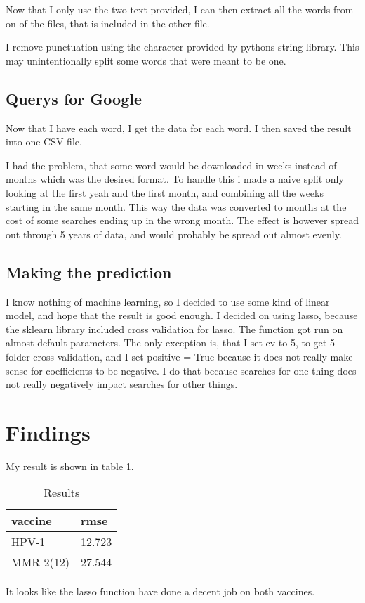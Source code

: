 \documentclass{sig-alternate}
\begin{document}
Now that I only use the two text provided, I can then extract all the words from on of the files, that is included in the other file.

I remove punctuation using the character provided by pythons string library. This may unintentionally split some words that were meant to be one.

\subsection*{Querys for Google}
Now that I have each word, I get the data for each word. I then saved the result into one CSV file.

I had the problem, that some word would be downloaded in weeks instead of months which was the desired format. To handle this i made a naive split only looking at the first yeah and the first month, and combining all the weeks starting in the same month. This way the data was converted to months at the cost of some searches ending up in the wrong month. The effect is however spread out through 5 years of data, and would probably be spread out almost evenly.

\subsection*{Making the prediction}
I know nothing of machine learning, so I decided to use some kind of linear model, and hope that the result is good enough. I decided on using lasso, because the sklearn library included cross validation for lasso. The function got run on  almost default parameters. The only exception is, that I set cv to 5, to get 5 folder cross validation, and I set positive = True because it does not really make sense for coefficients to be negative. I do that because searches for one thing does not really negatively impact searches for other things.

\section{Findings}
My result is shown in table 1.
\begin{table}[!h]
\centering
\caption{Results}
\label{my-label}
\begin{tabular}{|l|l|}
\hline
vaccine   & rmse    \\ \hline
HPV-1     & 12.723  \\ \hline
MMR-2(12) & 27.544  \\ \hline
\end{tabular}
\end{table}
It looks like the lasso function have done a decent job on both vaccines. 
\end{document}
